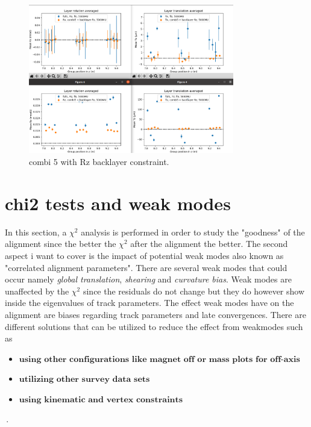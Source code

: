 \begin{figure}
  \centering
  \includegraphics[width=0.8\textwidth]{plots/oct_6/combi5_added_RZ_backlayer.png}
  \caption{combi 5 with Rz backlayer constraint.}
  \label{fig:oct6}
\end{figure}


\section{chi2 tests and weak modes}
In this section, a $\chi^2$ analysis is performed in order to study the "goodness" of the alignment since the better the $\chi^2$ after the alignment the better.
The second aspect i want to cover is the impact of potential weak modes also known as "correlated alignment parameters". There are several weak modes that could occur namely \textit{global translation}, \textit{shearing} and \textit{curvature bias}.
Weak modes are unaffected by the $\chi^2$ since the residuals do not change but they do however show inside the eigenvalues of track parameters.
The effect weak modes have on the alignment are biases regarding track parameters and late convergences.
There are different solutions that can be utilized to reduce the effect from weakmodes such as
\begin{itemize}
  \item $\textbf{using other configurations like magnet off or mass plots for off-axis events}$
  \item $\textbf{utilizing other survey data sets}$
  \item $\textbf{using kinematic and vertex constraints}$
\end{itemize}\,.

